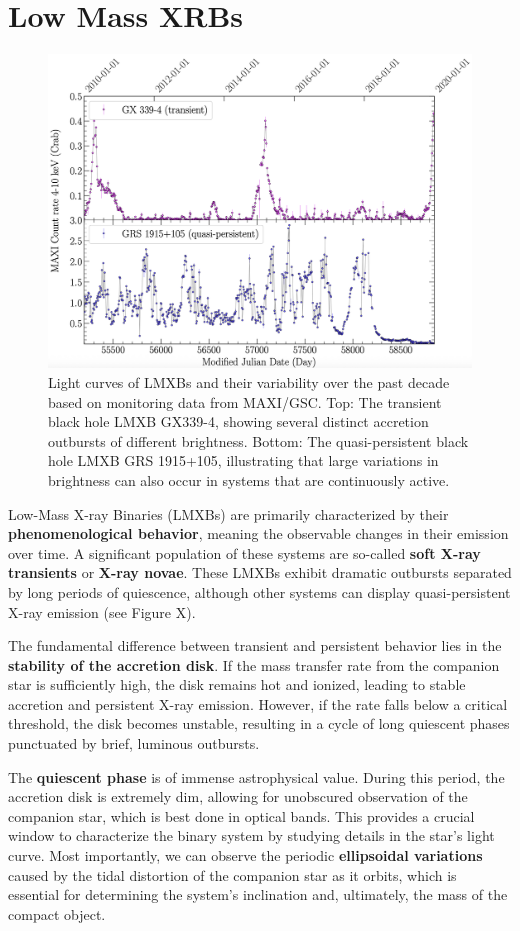 \section{Low Mass XRBs}
\begin{figure}[ht!]
    \centering
    \includegraphics[width=0.75\linewidth]{Pictures/figures/lmxb_lcurves.png}
    \caption{Light curves of LMXBs and their variability over the past decade based on monitoring data from MAXI/GSC. Top: The transient black hole LMXB GX339-4, showing several distinct accretion outbursts of different brightness. Bottom: The quasi-persistent black hole LMXB GRS 1915+105, illustrating that large variations in brightness can also occur in systems that are continuously active.}
    \label{fig:placeholder}
\end{figure}
Low-Mass X-ray Binaries (LMXBs) are primarily characterized by their \textbf{phenomenological behavior}, meaning the observable changes in their emission over time. A significant population of these systems are so-called \textbf{soft X-ray transients} or \textbf{X-ray novae}. These LMXBs exhibit dramatic outbursts separated by long periods of quiescence, although other systems can display quasi-persistent X-ray emission (see Figure X).

The fundamental difference between transient and persistent behavior lies in the \textbf{stability of the accretion disk}. If the mass transfer rate from the companion star is sufficiently high, the disk remains hot and ionized, leading to stable accretion and persistent X-ray emission. However, if the rate falls below a critical threshold, the disk becomes unstable, resulting in a cycle of long quiescent phases punctuated by brief, luminous outbursts.

The \textbf{quiescent phase} is of immense astrophysical value. During this period, the accretion disk is extremely dim, allowing for unobscured observation of the companion star, which is best done in optical bands. This provides a crucial window to characterize the binary system by studying details in the star's light curve. Most importantly, we can observe the periodic \textbf{ellipsoidal variations} caused by the tidal distortion of the companion star as it orbits, which is essential for determining the system's inclination and, ultimately, the mass of the compact object.

